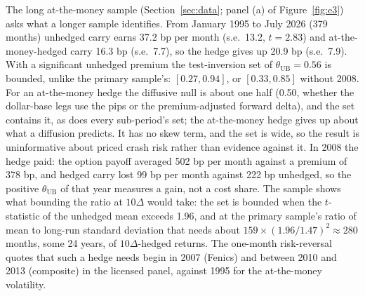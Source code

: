 \documentclass[11pt]{article}
\theoremstyle{result}
\newcommand{\thUB}{\theta_{\mathrm{UB}}}
\newcommand{\D}{\Delta}
\begin{document}
The long at-the-money sample (Section~\ref{sec:data}; panel (a) of Figure~\ref{fig:e3}) asks what a longer sample identifies. From January 1995 to July 2026 (379 months) unhedged carry earns 37.2 bp per month (s.e.\ 13.2, $t=2.83$) and at-the-money-hedged carry 16.3 bp (s.e.\ 7.7), so the hedge gives up 20.9 bp (s.e.\ 7.9). With a significant unhedged premium the test-inversion set of $\thUB=0.56$ is bounded, unlike the primary sample's: $[0.27,0.94]$, or $[0.33,0.85]$ without 2008. For an at-the-money hedge the diffusive null is about one half (0.50, whether the dollar-base legs use the pips or the premium-adjusted forward delta), and the set contains it, as does every sub-period's set; the at-the-money hedge gives up about what a diffusion predicts. It has no skew term, and the set is wide, so the result is uninformative about priced crash risk rather than evidence against it. In 2008 the hedge paid: the option payoff averaged 502 bp per month against a premium of 378 bp, and hedged carry lost 99 bp per month against 222 bp unhedged, so the positive $\thUB$ of that year measures a gain, not a cost share. The sample shows what bounding the ratio at $10\D$ would take: the set is bounded when the $t$-statistic of the unhedged mean exceeds 1.96, and at the primary sample's ratio of mean to long-run standard deviation that needs about $159\times(1.96/1.47)^2\approx280$ months, some 24 years, of $10\D$-hedged returns. The one-month risk-reversal quotes that such a hedge needs begin in 2007 (Fenics) and between 2010 and 2013 (composite) in the licensed panel, against 1995 for the at-the-money volatility.
\end{document}
